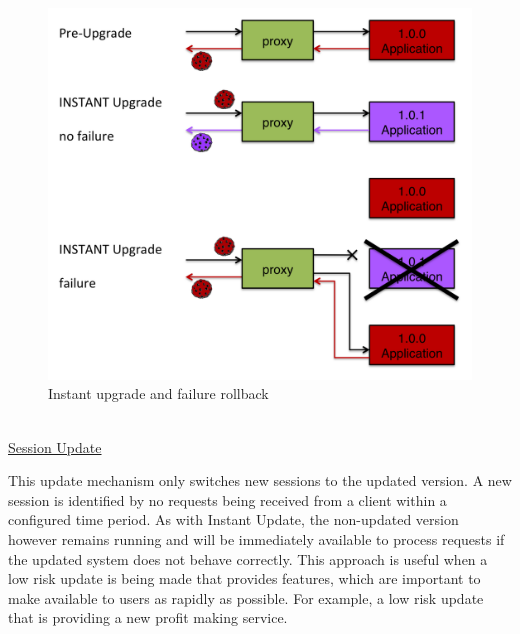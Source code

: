 \documentclass[a4paper,11pt,twoside]{report}
\begin{document}
\begin{figure}[!ht]
  \centering
     \includegraphics[scale=0.30]{instant_upgrade}
  \caption{Instant upgrade and failure rollback}
  \label{instant_upgrade}
\end{figure}

\noindent\\
\underline{Session Update}

\noindent
This update mechanism only switches new sessions to the updated version. A new session is identified by no requests being received from a client within a configured time period. As with Instant Update, the non-updated version however remains running and will be immediately available to process requests if the updated system does not behave correctly. This approach is useful when a low risk update is being made that provides features, which are important to make available to users as rapidly as possible. For example, a low risk update that is providing a new profit making service.
\end{document}
